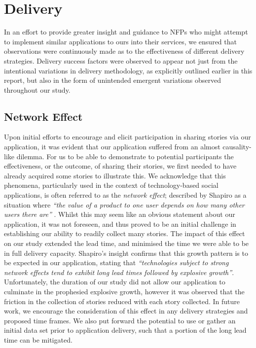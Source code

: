 \section{Delivery}

In an effort to provide greater insight and guidance to NFPs who might attempt to implement similar applications to ours into their services, we ensured that observations were continuously made as to the effectiveness of different delivery strategies. Delivery success factors were observed to appear not just from the intentional variations in delivery methodology, as explicitly outlined earlier in this report, but also in the form of unintended emergent variations observed throughout our study.

\subsection{Network Effect}

Upon initial efforts to encourage and elicit participation in sharing stories via our application, it was evident that our application suffered from an almost causality-like dilemma. For us to be able to demonstrate to potential participants the effectiveness, or the outcome, of sharing their stories, we first needed to have already acquired some stories to illustrate this. We acknowledge that this phenomena, particularly used in the context of technology-based social applications, is often referred to as the \emph{network effect}; described by Shapiro as a situation where \emph{“the value of a product to one user depends on how many other users there are”} \cite{shapiro1998information}. Whilst this may seem like an obvious statement about our application, it was not foreseen, and thus proved to be an initial challenge in establishing our ability to readily collect many stories. The impact of this effect on our study extended the lead time, and minimised the time we were able to be in full delivery capacity. Shapiro's insight confirms that this growth pattern is to be expected in our application, stating that \emph{“technologies subject to strong network effects tend to exhibit long lead times followed by explosive growth”}. Unfortunately, the duration of our study did not allow our application to culminate in the prophesied explosive growth, however it was observed that the friction in the collection of stories reduced with each story collected. In future work, we encourage the consideration of this effect in any delivery strategies and proposed time frames. We also put forward the potential to use or gather an initial data set prior to application delivery, such that a portion of the long lead time can be mitigated.

